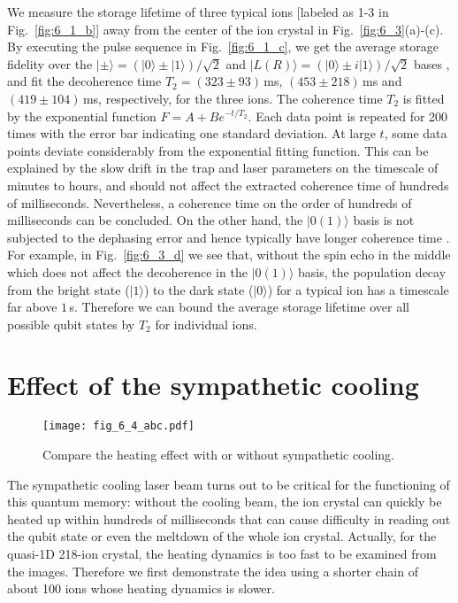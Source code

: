 We measure the storage lifetime of three typical ions [labeled as 1-3 in Fig.~\ref{fig:6_1_b}] away from the center of the ion crystal in Fig.~\ref{fig:6_3}(a)-(c). By executing the pulse sequence in Fig.~\ref{fig:6_1_c}, we get the average storage fidelity over the $|\pm\rangle=(|0\rangle\pm|1\rangle)/\sqrt{2}$ and $|L(R)\rangle=(|0\rangle\pm i|1\rangle)/\sqrt{2}$ bases \cite{wang2021single}, and fit the decoherence time $T_2=(323\pm 93)\,$ms, $(453\pm218)\,$ms and $(419\pm104)\,$ms, respectively, for the three ions. The coherence time $T_2$ is fitted by the exponential function $F=A+Be^{-t/T_2}$. Each data point is repeated for 200 times with the error bar indicating one standard deviation. At large $t$, some data points deviate considerably from the exponential fitting function. This can be explained by the slow drift in the trap and laser parameters on the timescale of minutes to hours, and should not affect the extracted coherence time of hundreds of milliseconds. Nevertheless, a coherence time on the order of hundreds of milliseconds can be concluded. On the other hand, the $|0(1)\rangle$ basis is not subjected to the dephasing error and hence typically have longer coherence time \cite{wang2021single}. For example, in Fig.~\ref{fig:6_3_d} we see that, without the spin echo in the middle which does not affect the decoherence in the $|0(1)\rangle$ basis, the population decay from the bright state ($|1\rangle$) to the dark state ($|0\rangle$) for a typical ion has a timescale far above $1\,$s. Therefore we can bound the average storage lifetime over all possible qubit states by $T_2$ for individual ions.



\section{Effect of the sympathetic cooling}

\begin{figure}
    \centering
    \texttt{[image: fig\_6\_4\_abc.pdf]}    \caption{Compare the heating effect with or without sympathetic cooling.}
    \label{fig:6_4_abc}
\end{figure}

The sympathetic cooling laser beam turns out to be critical for the functioning of this quantum memory: without the cooling beam, the ion crystal can quickly be heated up within hundreds of milliseconds that can cause difficulty in reading out the qubit state or even the meltdown of the whole ion crystal. Actually, for the quasi-1D 218-ion crystal, the heating dynamics is too fast to be examined from the images. Therefore we first demonstrate the idea using a shorter chain of about 100 ions whose heating dynamics is slower.

